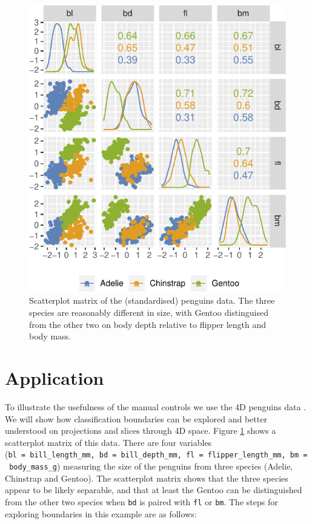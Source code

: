 \documentclass[]{interact}
\theoremstyle{plain}%
\theoremstyle{definition}
\theoremstyle{remark}
\begin{document}
\begin{figure}

{\centering \includegraphics[width=0.8\linewidth]{paper_files/figure-latex/penguins-scatmat-1} 

}

\caption{Scatterplot matrix of the (standardised) penguins data. The three species are reasonably different in size, with Gentoo distinguised from the other two on body depth relative to flipper length and body mass.}\label{fig:penguins-scatmat}
\end{figure}

\hypertarget{sec:examples}{%
\section{Application}\label{sec:examples}}

To illustrate the usefulness of the manual controls we use the 4D
penguins data \citep{penguins}. We will show how classification
boundaries can be explored and better understood on projections and
slices through 4D space. Figure \ref{fig:penguins-scatmat} shows a
scatterplot matrix of this data. There are four variables
(\texttt{bl\ =\ bill\_length\_mm,\ bd\ =\ bill\_depth\_mm,\ fl\ =\ flipper\_length\_mm,\ bm\ =\ body\_mass\_g})
measuring the size of the penguins from three species (Adelie, Chinstrap
and Gentoo). The scatterplot matrix shows that the three species appear
to be likely separable, and that at least the Gentoo can be
distinguished from the other two species when \texttt{bd} is paired with
\texttt{fl} or \texttt{bm}. The steps for exploring boundaries in this
example are as follows:
\end{document}
